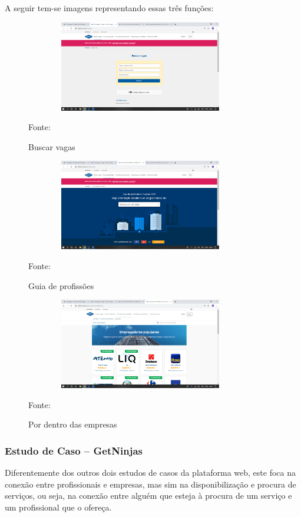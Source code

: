 A seguir tem-se imagens representando essas três funções:

\begin{figure}[!h]
	\centering
	\caption{Buscar vagas}
	\includegraphics[width=380px, height=150px]{./images/cattho1.png}
	\par {Fonte: \cite{catho-1}}
\end{figure}

\begin{figure}[!h]
	\centering
	\caption{Guia de profissões}
	\includegraphics[width=380px, height=150px]{./images/cattho2.png}
	\par {Fonte: \cite{catho-2}}
\end{figure}

\begin{figure}[!h]
	\centering
	\caption{Por dentro das empresas}
	\includegraphics[width=380px, height=150px]{./images/cattho3.png}
	\par {Fonte: \cite{catho-3}}
\end{figure}
\newpage 
\subsubsection{Estudo de Caso – GetNinjas}

Diferentemente dos outros dois estudos de casos da plataforma web, este foca na conexão entre profissionais e empresas, mas sim na disponibilização e procura de serviços, ou seja, na conexão entre alguém que esteja à procura de um serviço e um profissional que o ofereça.

